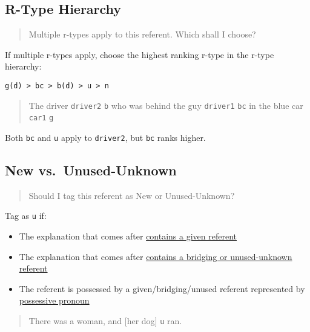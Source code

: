 \documentclass[
]{book}
\begin{document}
\hypertarget{r-type-hierarchy}{%
\subsection{R-Type Hierarchy}\label{r-type-hierarchy}}

\begin{quote}
Multiple r-types apply to this referent. Which shall I choose?
\end{quote}

If multiple r-types apply,
choose the highest ranking r-type in the r-type hierarchy:

\texttt{g(d)\ \textgreater{}\ bc\ \textgreater{}\ b(d)\ \textgreater{}\ u\ \textgreater{}\ n}

\begin{quote}
The driver \texttt{driver2} \texttt{b} who was behind the guy \texttt{driver1} \texttt{bc}
in the blue car \texttt{car1} \texttt{g}
\end{quote}

Both \texttt{bc} and \texttt{u} apply to \texttt{driver2}, but \texttt{bc} ranks higher.

\hypertarget{new-vs.-unused-unknown}{%
\subsection{New vs.~Unused-Unknown}\label{new-vs.-unused-unknown}}

\begin{quote}
Should I tag this referent as New or Unused-Unknown?
\end{quote}

Tag as \texttt{u} if:

\begin{itemize}
\item
  The explanation that comes after \protect\hyperlink{explanation-given-referent}{contains a given referent}
\item
  The explanation that comes after \protect\hyperlink{explanation-bridging-or-unused-unknown-referent}{contains a bridging or unused-unknown referent}
\item
  The referent is possessed by a given/bridging/unused referent represented by \protect\hyperlink{possessive-pronouns}{possessive pronoun}
\end{itemize}

\begin{quote}
There was a woman, and {[}her dog{]} \texttt{u} ran.
\end{quote}
\end{document}
